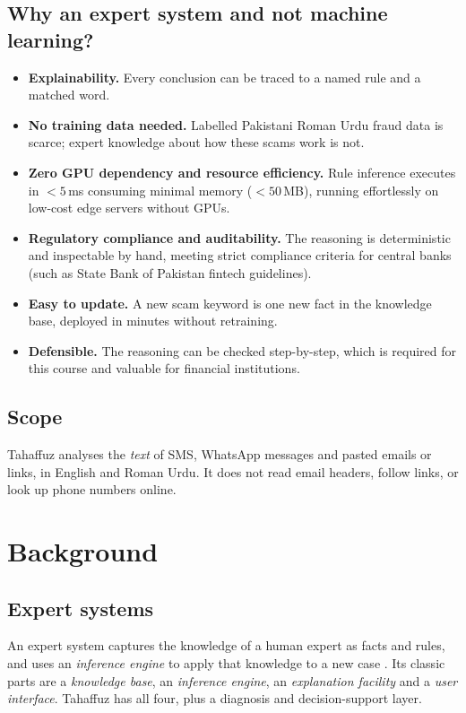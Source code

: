 \documentclass[11pt,a4paper]{article}
\begin{document}
\subsection{Why an expert system and not machine learning?}
\begin{itemize}
  \item \textbf{Explainability.} Every conclusion can be traced to a named rule and a matched word.
  \item \textbf{No training data needed.} Labelled Pakistani Roman Urdu fraud data is scarce; expert
        knowledge about how these scams work is not.
  \item \textbf{Zero GPU dependency and resource efficiency.} Rule inference executes in $<5$\,ms
        consuming minimal memory ($<50$\,MB), running effortlessly on low-cost edge servers without GPUs.
  \item \textbf{Regulatory compliance and auditability.} The reasoning is deterministic and inspectable by
        hand, meeting strict compliance criteria for central banks (such as State Bank of Pakistan fintech guidelines).
  \item \textbf{Easy to update.} A new scam keyword is one new fact in the knowledge base, deployed in minutes without retraining.
  \item \textbf{Defensible.} The reasoning can be checked step-by-step, which is required for this course
        and valuable for financial institutions.
\end{itemize}

\subsection{Scope}
Tahaffuz analyses the \emph{text} of SMS, WhatsApp messages and pasted emails or links, in English and
Roman Urdu. It does not read email headers, follow links, or look up phone numbers online.

\section{Background}

\subsection{Expert systems}
An expert system captures the knowledge of a human expert as facts and rules, and uses an
\emph{inference engine} to apply that knowledge to a new case \cite{giarratano2005}. Its classic parts are
a \emph{knowledge base}, an \emph{inference engine}, an \emph{explanation facility} and a
\emph{user interface}. Tahaffuz has all four, plus a diagnosis and decision-support layer.
\end{document}
